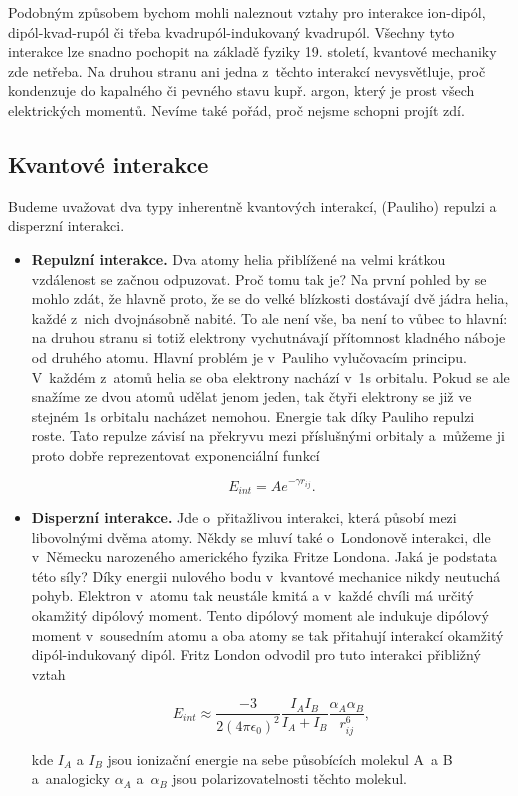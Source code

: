 Podobným způsobem bychom mohli naleznout vztahy pro interakce ion-dipól, dipól-kvad-rupól či třeba kvadrupól-indukovaný kvadrupól. Všechny tyto interakce lze snadno pochopit na základě fyziky 19. století, kvantové mechaniky zde netřeba. Na druhou stranu ani jedna z~těchto interakcí nevysvětluje, proč kondenzuje do kapalného či pevného stavu kupř. argon, který je prost všech elektrických momentů. Nevíme také pořád, proč nejsme schopni projít zdí.

\subsection{Kvantové interakce}   

Budeme uvažovat dva typy inherentně kvantových interakcí, (Pauliho) repulzi a disperzní interakci.

\begin{itemize} 

\item \textbf{Repulzní interakce.} Dva atomy helia přiblížené na velmi krátkou vzdálenost se začnou odpuzovat. Proč tomu tak je? Na první pohled by se mohlo zdát, že hlavně proto, že se do velké blízkosti dostávají dvě jádra helia, každé z~nich dvojnásobně nabité. To ale není vše, ba není to vůbec to hlavní: na druhou stranu si totiž elektrony vychutnávají přítomnost kladného náboje od druhého atomu. Hlavní problém je v~Pauliho vylučovacím principu. V~každém z~atomů helia se oba elektrony nachází v~1s orbitalu. Pokud se ale snažíme  ze dvou atomů udělat jenom jeden, tak čtyři elektrony se již ve stejném 1s orbitalu nacházet nemohou. Energie tak díky Pauliho repulzi roste. Tato repulze závisí na překryvu mezi příslušnými orbitaly a~můžeme ji proto dobře reprezentovat exponenciální funkcí
   

\begin{equation}
E_{int} = A e^{- \gamma r_{ij}}.
\label{rov:MS-4}
\end{equation}


\item \textbf{Disperzní interakce.} Jde o~přitažlivou interakci, která působí mezi libovolnými dvěma atomy. Někdy se mluví také o~Londonově interakci, dle v~Německu narozeného amerického fyzika Fritze Londona. Jaká je podstata této síly? Díky energii nulového bodu v~kvantové mechanice nikdy neutuchá pohyb. Elektron v~atomu tak neustále kmitá a v~každé chvíli má určitý okamžitý dipólový moment. Tento dipólový moment ale indukuje dipólový moment v~sousedním atomu a oba atomy se tak přitahují interakcí okamžitý dipól-indukovaný dipól. Fritz London odvodil pro tuto interakci přibližný vztah

\begin{equation}
E_{int} \approx \frac{-3}{2 (4 \pi \epsilon_0)^2} \frac{I_A I_B}{I_A + I_B} \frac{\alpha_A \alpha_B}{r_{ij}^6},
\label{rov:MS-5}
\end{equation}

\noindent 
kde $I_A$ a $I_B$ jsou ionizační energie na sebe působících molekul A~a B a~analogicky $\alpha_A$ a~$\alpha_B$ jsou polarizovatelnosti těchto molekul.  
\end{itemize}

